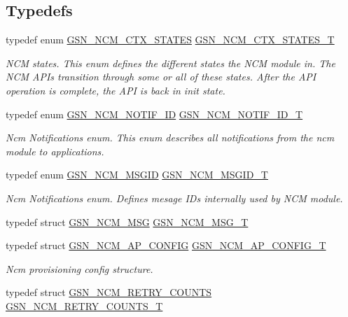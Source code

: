 \subsection*{Typedefs}
\begin{DoxyCompactItemize}
\item 
typedef enum \hyperlink{a00688_ga950af3c458482d4fbf1838aaf8b30f2d}{GSN\_\-NCM\_\-CTX\_\-STATES} \hyperlink{a00688_gaf5a85b17466f3a523dbf5643e72f628d}{GSN\_\-NCM\_\-CTX\_\-STATES\_\-T}
\begin{DoxyCompactList}\small\item\em NCM states. This enum defines the different states the NCM module in. The NCM APIs transition through some or all of these states. After the API operation is complete, the API is back in init state. \end{DoxyCompactList}\item 
typedef enum \hyperlink{a00688_ga9e3bfe0ed58e26633d51d10250743b2a}{GSN\_\-NCM\_\-NOTIF\_\-ID} \hyperlink{a00688_ga0be96257e7b0db4dd67006357eb5cec6}{GSN\_\-NCM\_\-NOTIF\_\-ID\_\-T}
\begin{DoxyCompactList}\small\item\em Ncm Notifications enum. This enum describes all notifications from the ncm module to applications. \end{DoxyCompactList}\item 
typedef enum \hyperlink{a00688_ga7df8ae3172682e89bfa663208e3f0081}{GSN\_\-NCM\_\-MSGID} \hyperlink{a00688_ga1df95350543744eb99d0ce7433e6db16}{GSN\_\-NCM\_\-MSGID\_\-T}
\begin{DoxyCompactList}\small\item\em Ncm Notifications enum. Defines mesage IDs internally used by NCM module. \end{DoxyCompactList}\item 
typedef struct \hyperlink{a00160}{GSN\_\-NCM\_\-MSG} \hyperlink{a00529_aad1d86cebf715133449a991798027533}{GSN\_\-NCM\_\-MSG\_\-T}
\item 
typedef struct \hyperlink{a00156}{GSN\_\-NCM\_\-AP\_\-CONFIG} \hyperlink{a00688_ga881c978ce73a5c4c2e6e9080d4a07879}{GSN\_\-NCM\_\-AP\_\-CONFIG\_\-T}
\begin{DoxyCompactList}\small\item\em Ncm provisioning config structure. \end{DoxyCompactList}\item 
typedef struct \hyperlink{a00161}{GSN\_\-NCM\_\-RETRY\_\-COUNTS} \hyperlink{a00688_gab0e77b5fbb8b18c829e3cd9170252340}{GSN\_\-NCM\_\-RETRY\_\-COUNTS\_\-T}

\end{DoxyCompactItemize}
